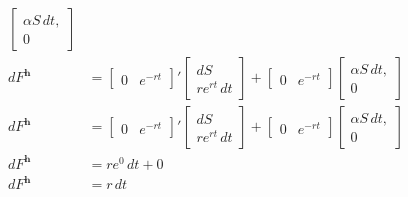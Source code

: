 \documentclass[11pt]{article}
\begin{document}
\begin{itemize}
\begin{align*}
\begin{bmatrix}
        \alpha S \,dt, \\ 0 \end{bmatrix} \\ 
        dF^{\boldsymbol{h}}&=\begin{bmatrix} 0 & e^{-rt} \end{bmatrix}'\begin{bmatrix}
        dS \\ re^{rt} \,dt \end{bmatrix}+\begin{bmatrix} 0 & e^{-rt} \end{bmatrix}\begin{bmatrix}
        \alpha S \,dt, \\ 0 \end{bmatrix} \\ 
        dF^{\boldsymbol{h}}&=\begin{bmatrix} 0 & e^{-rt} \end{bmatrix}'\begin{bmatrix}
        dS \\ re^{rt} \,dt \end{bmatrix}+\begin{bmatrix} 0 & e^{-rt} \end{bmatrix}\begin{bmatrix}
        \alpha S \,dt, \\ 0 \end{bmatrix} \\ 
        dF^{\boldsymbol{h}} &= re^0\,dt + 0 \\
        dF^{\boldsymbol{h}} &= r\,dt \\
    \end{align*}
\end{itemize}
\end{document}

